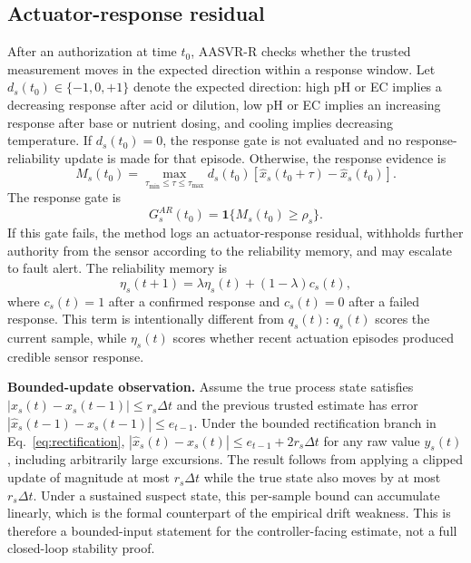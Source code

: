\documentclass[preprint,12pt,doubleblind]{elsarticle}
\begin{document}
\subsection{Actuator-response residual}
After an authorization at time $t_0$, AASVR-R checks whether the trusted measurement moves in the expected direction within a response window. Let $d_s(t_0)\in\{-1,0,+1\}$ denote the expected direction: high pH or EC implies a decreasing response after acid or dilution, low pH or EC implies an increasing response after base or nutrient dosing, and cooling implies decreasing temperature. If $d_s(t_0)=0$, the response gate is not evaluated and no response-reliability update is made for that episode. Otherwise, the response evidence is
\begin{equation}
M_s(t_0)=\max_{\tau_{\min}\le \tau\le \tau_{\max}} d_s(t_0)\left[\hat{x}_s(t_0+\tau)-\hat{x}_s(t_0)\right].
\end{equation}
The response gate is
\begin{equation}
G^{AR}_s(t_0)=\mathbf{1}\{M_s(t_0)\ge \rho_s\}.
\end{equation}
If this gate fails, the method logs an actuator-response residual, withholds further authority from the sensor according to the reliability memory, and may escalate to fault alert. The reliability memory is
\begin{equation}
\eta_s(t+1)=\lambda\eta_s(t)+(1-\lambda)c_s(t),
\end{equation}
where $c_s(t)=1$ after a confirmed response and $c_s(t)=0$ after a failed response. This term is intentionally different from $q_s(t)$: $q_s(t)$ scores the current sample, while $\eta_s(t)$ scores whether recent actuation episodes produced credible sensor response.

\noindent\textbf{Bounded-update observation.} Assume the true process state satisfies $|x_s(t)-x_s(t-1)|\le r_s\Delta t$ and the previous trusted estimate has error $|\hat{x}_s(t-1)-x_s(t-1)|\le e_{t-1}$. Under the bounded rectification branch in Eq.~\eqref{eq:rectification}, $|\hat{x}_s(t)-x_s(t)|\le e_{t-1}+2r_s\Delta t$ for any raw value $y_s(t)$, including arbitrarily large excursions. The result follows from applying a clipped update of magnitude at most $r_s\Delta t$ while the true state also moves by at most $r_s\Delta t$. Under a sustained suspect state, this per-sample bound can accumulate linearly, which is the formal counterpart of the empirical drift weakness. This is therefore a bounded-input statement for the controller-facing estimate, not a full closed-loop stability proof.
\end{document}
